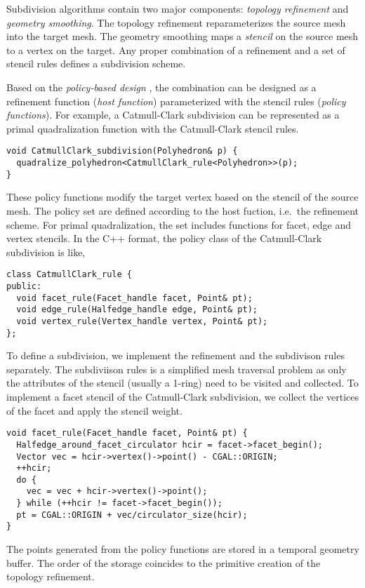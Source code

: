 Subdivision algorithms contain two major components: \emph{topology
refinement} and \emph{geometry smoothing}.  The topology refinement
reparameterizes the source mesh into the target mesh. The geometry
smoothing maps a \emph{stencil} on the source mesh to a vertex on the
target. Any proper combination of a refinement and a set of stencil
rules defines a subdivision scheme.

Based on the \emph{policy-based design} \cite{a-rotm-02}, the
combination can be designed as a refinement function (\emph{host
function}) parameterized with the stencil rules (\emph{policy
functions}). For example, a Catmull-Clark subdivision can be
represented as a primal quadralization function with the Catmull-Clark
stencil rules.
\begin{lstlisting}
void CatmullClark_subdivision(Polyhedron& p) {
  quadralize_polyhedron<CatmullClark_rule<Polyhedron>>(p);
}
\end{lstlisting}
These policy functions modify the target vertex based on the stencil
of the source mesh. The policy set are defined according to the host
fuction, i.e.\ the refinement scheme. For primal quadralization, the
set includes functions for facet, edge and vertex stencils. In the C++
format, the policy class of the Catmull-Clark subdivision is like,
\begin{lstlisting}
class CatmullClark_rule {
public:
  void facet_rule(Facet_handle facet, Point& pt);
  void edge_rule(Halfedge_handle edge, Point& pt);
  void vertex_rule(Vertex_handle vertex, Point& pt);
};
\end{lstlisting}

To define a subdivision, we implement the refinement and the
subdivison rules separately.  The subdiviison rules is a simplified
mesh traversal problem as only the attributes of the stencil (usually
a 1-ring) need to be visited and collected. To implement a facet
stencil of the Catmull-Clark subdivision, we collect the vertices of
the facet and apply the stencil weight.
\begin{lstlisting}
void facet_rule(Facet_handle facet, Point& pt) {
  Halfedge_around_facet_circulator hcir = facet->facet_begin();
  Vector vec = hcir->vertex()->point() - CGAL::ORIGIN;
  ++hcir;
  do {
    vec = vec + hcir->vertex()->point();
  } while (++hcir != facet->facet_begin());
  pt = CGAL::ORIGIN + vec/circulator_size(hcir);
}
\end{lstlisting}

The points generated from the policy functions are stored in a
temporal geometry buffer. The order of the storage coincides to the
primitive creation of the topology refinement.

